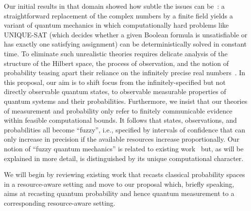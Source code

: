 \documentclass{article}
\theoremstyle{remark}
\begin{document}
Our initial results in that domain showed how subtle the
issues can be~\cite{usat,geometry2013,DQT2014}: a straightforward
replacement of the complex numbers by a finite field yields a variant
of quantum mechanics in which computationally hard problems like
UNIQUE-SAT (which decides whether a given Boolean formula is
unsatisfiable or has exactly one satisfying assignment) can be
deterministically solved in constant time. To eliminate such
unrealistic theories requires delicate analysis of the structure of
the Hilbert space, the process of observation, and the notion of
probability teasing apart their reliance on the infinitely precise
real numbers~\cite{geometry2013,DQT2014}. In this proposal, our aim is
to shift focus from the infinitely-specified but not directly
observable quantum states, to observable measurable properties of
quantum systems and their probabilities. Furthermore, we insist that
our theories of measurement and probability only refer to finitely
communicable evidence within feasible computational bounds. It follows
that states, observations, and probabilities all become ``fuzzy'',
i.e., specified by intervals of confidence that can only increase in
precision if the available resources increase proportionally. Our
notion of ``fuzzy quantum mechanics'' is related to existing
work~\cite{GranikCaulfield1996,Pykacz2013,SNL2009,Gudder2005,aerts1993physical}
but, as will be explained in more detail, is distinguished by its
unique computational character.

We will begin by reviewing existing work that recasts classical
probability spaces in a resource-aware setting and move to our
proposal which, briefly speaking, aims at recasting quantum
probability and hence quantum measurement to a corresponding
resource-aware setting.
\end{document}
